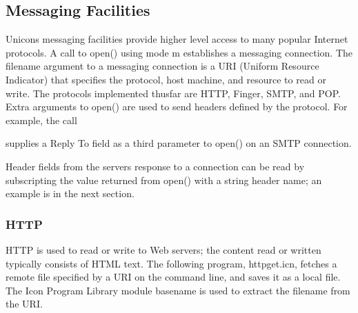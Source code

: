 \subsection{Messaging Facilities}

Unicon{\textquotesingle}s messaging facilities provide
higher level access to many popular Internet protocols. A call to
\textsf{open()} using mode \textsf{{\textquotedbl}m{\textquotedbl}}
establishes a messaging connection. The filename argument to a
messaging connection is a URI (Uniform Resource Indicator) that
specifies the protocol, host machine, and resource to read or write.
The protocols implemented thusfar are HTTP, Finger, SMTP, and POP.
Extra arguments to open() are used to send headers defined by the
protocol. For example, the call


\noindent
supplies a Reply To field as a third parameter to \textsf{open()} on an
SMTP connection.

Header fields from the server{\textquotesingle}s response to a
connection can be read by subscripting the value returned from
\textsf{open()} with a string header name; an example is in the next
section.

\subsubsection{HTTP}

HTTP is used to read or write to Web servers; the content
read or written typically consists of HTML text. The
following program, \textsf{httpget.icn}, fetches a remote file
specified by a URI on the command line, and saves it as a local file.
The Icon Program Library module \textsf{basename} is used to extract
the filename from the URI.



